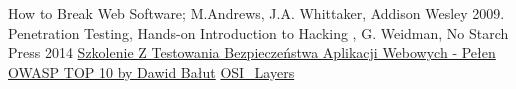 \documentclass{article}[12pt]
\begin{document}

\begin{thebibliography}{9}
How to Break Web Software; M.Andrews, J.A. Whittaker, Addison Wesley 2009.
Penetration Testing, Hands-on Introduction to Hacking , G. Weidman, No Starch Press 2014
\href{https://www.youtube.com/watch?v=04c0JiE8YNQ}{Szkolenie Z Testowania Bezpieczeństwa Aplikacji Webowych - Pełen OWASP TOP 10 by Dawid Bałut}
\href{https://www.webopedia.com/quick_ref/OSI_Layers.asp}{OSI\_Layers}

\end{thebibliography}
\end{document}
